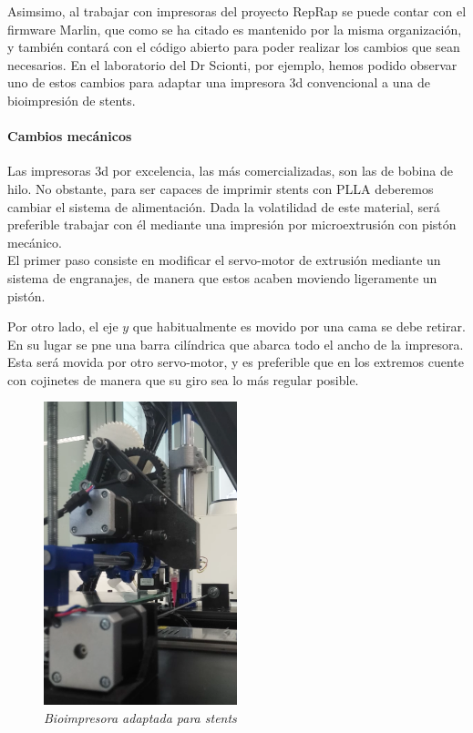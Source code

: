 \documentclass[a4paper,12pt]{article}
\begin{document}
Asimsimo, al trabajar con impresoras del proyecto RepRap se puede contar con el firmware Marlin, que como se ha citado es mantenido por la misma organización, y también contará con el código abierto para poder realizar los cambios que sean necesarios. En el laboratorio del Dr Scionti, por ejemplo, hemos podido observar uno de estos cambios para adaptar una impresora 3d convencional a una de bioimpresión de stents.\\

\paragraph{Cambios mecánicos}
Las impresoras 3d por excelencia, las más comercializadas, son las de bobina de hilo. No obstante, para ser capaces de imprimir stents con PLLA deberemos cambiar el sistema de alimentación. Dada la volatilidad de este material, será preferible trabajar con él mediante una impresión por microextrusión con pistón mecánico.\\

El primer paso consiste en modificar el servo-motor de extrusión mediante un sistema de engranajes, de manera que estos acaben moviendo ligeramente un pistón.


Por otro lado, el eje $y$ que habitualmente es movido por una cama se debe retirar. En su lugar se pne una barra cilíndrica que abarca todo el ancho de la impresora. Esta será movida por otro servo-motor, y es preferible que en los extremos cuente con cojinetes de manera que su giro sea lo más regular posible.

	\begin{figure}[!ht]
	\begin{center}
	  \includegraphics[width=0.5\textwidth]{Figuras/stents_adapt.png}
	  \caption{\emph{Bioimpresora adaptada para stents}}
	\end{center}
	\label{stents_adapt}
	\end{figure}
\end{document}
